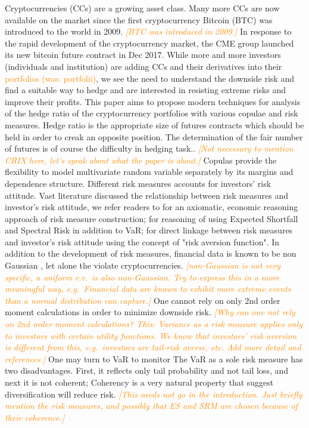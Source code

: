 \documentclass[11pt,a4paper,english]{article}
\providecommand{\natp}[1]{\textcolor{darkorange}{#1}}
\begin{document}
Cryptocurrencies (CCs) are a growing asset class.
Many more CCs are now available on the market since the first
cryptocurrency Bitcoin (BTC) was {\color{blue}introduced to the world in 2009}. \natp{\em [BTC was introduced in 2009.]}
In response to the rapid development of the cryptocurrency market, the CME group launched its new bitcoin future contract in Dec 2017.
While more and more investors (individuals and institution) are adding
CCs and their derivatives into their \natp{portfolios (was: portfolii)}, 
we see the need to understand the downside risk and find a suitable way to hedge and are interested in resisting extreme risks and improve their profits. {\color{blue}This paper aims to propose modern techniques for analysis of the hedge ratio of the cryptocurrency portfolios with various copulae and risk measures. Hedge ratio is the appropriate size of futures contracts which should be held in order to creak an opposite position. The determination of the fair number of futures is of course the difficulty in hedging task.}. \natp{\em [Not necessary to mention CRIX here, let's speak
  about what the paper is about.]}
Copulas provide the flexibility to model multivariate random variable
separately by its margins and dependence structure. 
Different risk measures accounts for investors' risk attitude.
Vast literature discussed the relationship between risk measures and investor's risk attitude, we refer readers to
\citet{artzner1999coherent} for an axiomatic, economic reasoning approach of risk measure construction;
\citet{embrechts2002correlation} for reasoning of using Expected Shortfall and Spectral Risk in addition to VaR;
\citet{Acerbi2002} for direct linkage between risk measures and investor's risk attitude using the concept of "risk aversion function".
In addition to the development of risk measures, financial data is known to be non Gaussian \natp{\cite{Cont2001}}, let
alone the violate cryptocurrencies. \natp{\em [non-Gaussian is not
  very specific, a uniform r.v.\ is also non-Gaussian. Try to express
  this in a more meaningful way, e.g.\ Financial data are known to
  exhibit more extreme events than a normal distribution can capture.]}
One cannot rely on only 2nd order moment calculations in order to
minimize downside risk. \natp{\em [Why can one not rely on 2nd order
  moment calculations? This: Variance as a risk measure applies only
  to investors with certain utility functions. We know that investors'
  risk aversion is different from this, e.g.\ investors are tail-risk
  averse, etc. Add more detail and references.]}
One may turn to VaR to monitor The VaR as a sole risk measure has two disadvantages.
First, it reflects only tail probability and not tail loss, and next it is not coherent;
Coherency is a very natural property that suggest diversification will
reduce risk. \natp{\em [This needs not go in the introduction. Just briefly mention the risk measures, and possibly that ES and SRM are chosen because of their coherence.]}
\medskip
\end{document}
